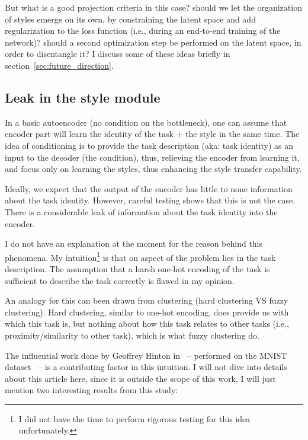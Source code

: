     But what is a good projection criteria in this case? should we let the organization of styles emerge on its own, by constraining the latent space and add regularization to the loss function (i.e., during an end-to-end training of the network)? should a second optimization step be performed on the latent space, in order to disentangle it? I discuss some of these ideas briefly in section~\ref{sec:future_direction}.

  \subsection{Leak in the style module}
    \par In a basic autoencoder (no condition on the bottleneck), one can assume that encoder part will learn the identity of the task + the style in the same time. The idea of conditioning is to provide the task description (aka: task identity) as an input to the decoder (the condition), thus, relieving the encoder from learning it, and focus only on learning the styles, thus enhancing the style transfer capability.

    Ideally, we expect that the output of the encoder has little to none information about the task identity. However, careful testing shows that this is not the case. There is a considerable leak of information about the task identity into the encoder.


    I do not have an explanation at the moment for the reason behind this phenomena. My intuition\footnote{I did not have the time to perform rigorous testing for this idea unfortunately.} is that on aspect of the problem lies in the task description. The assumption that a harsh one-hot encoding of the task is sufficient to describe the task correctly is flawed in my opinion.

    An analogy for this can been drawn from clustering (hard clustering VS fuzzy clustering). Hard clustering, similar to one-hot encoding, does provide us with which this task is, but nothing about how this task relates to other tasks (i.e., proximity/similarity to other task), which is what fuzzy clustering do.

    The influential work done by Geoffrey Hinton in~\citep{hinton2015distilling} -- performed on the MNIST dataset~\citep{lecun-mnisthandwrittendigit-2010} -- is a contributing factor in this intuition. I will not dive into details about this article here, since it is outside the scope of this work, I will just mention two interesting results from this study:

